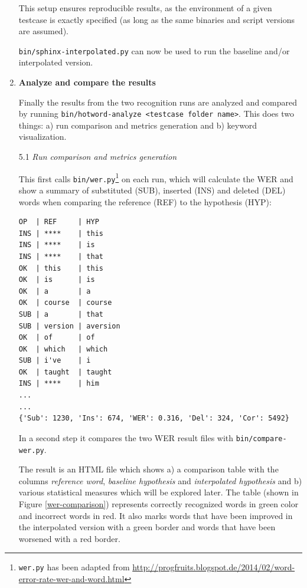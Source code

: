 \documentclass[]{article}
\begin{document}
\begin{enumerate}
  This setup ensures reproducible results, as the environment of a given
  testcase is exactly specified (as long as the same binaries and script
  versions are assumed).

  \texttt{bin/sphinx-interpolated.py} can now be used to run the
  baseline and/or interpolated version.
\item
  \textbf{Analyze and compare the results}

  Finally the results from the two recognition runs are analyzed and
  compared by running
  \texttt{bin/hotword-analyze\ \textless{}testcase\ folder\ name\textgreater{}}.
  This does two things: a) run comparison and metrics generation and b)
  keyword visualization.

  5.1 \emph{Run comparison and metrics generation}

  This first calls \texttt{bin/wer.py}\footnote{\texttt{wer.py} has been
    adapted from
    \url{http://progfruits.blogspot.de/2014/02/word-error-rate-wer-and-word.html}}
  on each run, which will calculate the WER and show a summary of
  substituted (SUB), inserted (INS) and deleted (DEL) words when
  comparing the reference (REF) to the hypothesis (HYP):

\begin{verbatim}
OP  | REF     | HYP
INS | ****    | this
INS | ****    | is
INS | ****    | that
OK  | this    | this
OK  | is      | is
OK  | a       | a
OK  | course  | course
SUB | a       | that
SUB | version | aversion
OK  | of      | of
OK  | which   | which
SUB | i've    | i
OK  | taught  | taught
INS | ****    | him
...
...
{'Sub': 1230, 'Ins': 674, 'WER': 0.316, 'Del': 324, 'Cor': 5492}
\end{verbatim}

  In a second step it compares the two WER result files with
  \texttt{bin/compare-wer.py}.

  The result is an HTML file which shows a) a comparison table with the
  columns \emph{reference word}, \emph{baseline hypothesis} and
  \emph{interpolated hypothesis} and b) various statistical measures
  which will be explored later. The table (shown in Figure
  \ref{wer-comparison}) represents correctly recognized words in green
  color and incorrect words in red. It also marks words that have been
  improved in the interpolated version with a green border and words
  that have been worsened with a red border.


\end{enumerate}
\end{document}
